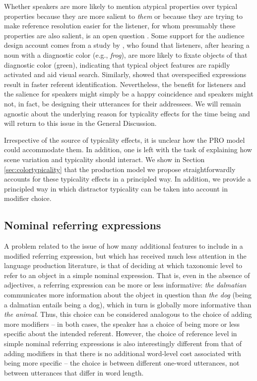 \documentclass[11pt]{article}
\newcommand{\jd}[1]{\textcolor{Red}{[jd: #1]}}
\newcommand{\sectionref}[1]{Section \ref{#1}}
\begin{document}
Whether speakers are more likely to mention atypical properties over typical properties because they are more salient to \emph{them} or because they are trying to make reference resolution easier for the listener, for whom presumably these properties are also salient, is an open question \cite{Westerbeek2015}. Some support for the audience design account comes from a study by , who found that listeners, after hearing a noun with a diagnostic color (e.g., \emph{frog}), are more likely to fixate objects of that diagnostic color (green), indicating that typical object features are rapidly activated and aid visual search. Similarly,  showed that overspecified expressions result in faster referent identification.  Nevertheless, the benefit for listeners and the salience for speakers might simply be a happy coincidence and speakers might not, in fact, be designing their utterances for their addressees. We will remain agnostic about the underlying reason for typicality effects for the time being and will return to this issue in the General Discussion. %

Irrespective of the source of typicality effects, it is unclear how the PRO model could accommodate them. In addition, one is left with the task of explaining how scene variation and typicality should interact. We show in \sectionref{sec:colortypicality} that the production model we propose straightforwardly accounts for these typicality effects in a principled way. In addition, we provide a principled way in which distractor typicality can be taken into account in modifier choice.

\subsection{Nominal referring expressions}
\label{sec:nominalintro}

A problem related to the issue of how many additional features to include in a modified referring expression, but which has received much less attention in the language production literature, is that of deciding at which taxonomic level to refer to an object in a simple nominal expression. That is, even in the absence of adjectives, a referring expression can be more or less informative: \emph{the dalmatian} communicates more information about the object in question than \emph{the dog} (being a dalmatian entails being a dog), which in turn is globally more informative than \emph{the animal}. Thus, this choice can be considered analogous to the choice of adding more modifiers -- in both cases, the speaker has a choice of being more or less specific about the intended referent. However, the choice of reference level in simple nominal referring expressions is also interestingly different from that of adding modifiers in that there is no additional word-level cost associated with being more specific -- the choice is between different one-word utterances, not between utterances that differ in word length. 
\end{document}
